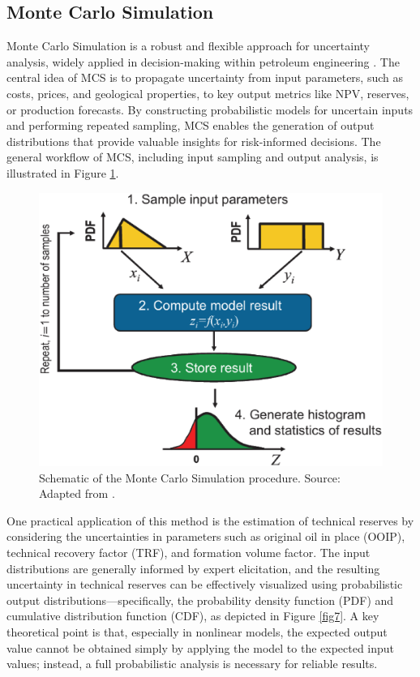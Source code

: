 \documentclass[pdflatex,sn-basic]{sn-jnl}%
\theoremstyle{thmstyleone}%
\theoremstyle{thmstyletwo}%
\theoremstyle{thmstylethree}%
\begin{document}
\subsection{Monte Carlo Simulation}\label{subsec42}

Monte Carlo Simulation is a robust and flexible approach for uncertainty analysis, widely applied in decision-making within petroleum engineering \citep{ref24}. The central idea of MCS is to propagate uncertainty from input parameters, such as costs, prices, and geological properties, to key output metrics like NPV, reserves, or production forecasts. By constructing probabilistic models for uncertain inputs and performing repeated sampling, MCS enables the generation of output distributions that provide valuable insights for risk-informed decisions. The general workflow of MCS, including input sampling and output analysis, is illustrated in Figure \ref{fig6}.

\begin{figure}[H]
\centering
\begin{minipage}{0.75\textwidth}
  \includegraphics[width=\textwidth]{schematic_MCS.eps}
  \caption{Schematic of the Monte Carlo Simulation procedure. Source: Adapted from \cite{ref24}.}
  \label{fig6}
\end{minipage}
\end{figure}

One practical application of this method is the estimation of technical reserves by considering the uncertainties in parameters such as original oil in place (OOIP), technical recovery factor (TRF), and formation volume factor. The input distributions are generally informed by expert elicitation, and the resulting uncertainty in technical reserves can be effectively visualized using probabilistic output distributions—specifically, the probability density function (PDF) and cumulative distribution function (CDF), as depicted in Figure \ref{fig7}. A key theoretical point is that, especially in nonlinear models, the expected output value cannot be obtained simply by applying the model to the expected input values; instead, a full probabilistic analysis is necessary for reliable results.
\end{document}
